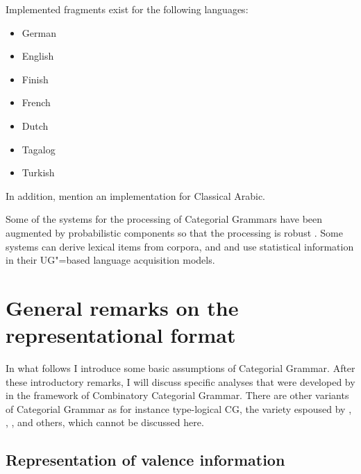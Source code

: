 Implemented fragments exist for the following languages:
\begin{itemize}
\item German \citep*{Uszkoreit86d,Koenig99a-u,VHE2003a,VTBS2011a}
\item English \citep{Villavicencio2002a,Baldridge2002a-u,Beavers2002a-u,Beavers2004a-u}
\item Finish \citep{Karttunen89a-u}
\item French \citep*{BBCG87a-u}
\item Dutch \citep{BvN94a-u,Baldridge2002a-u}
\item Tagalog \citep{Baldridge2002a-u}
\item Turkish \citep{Hoffmann95a-u,Baldridge2002a-u}
\end{itemize}
In addition, \citet*[]{BCPW2007a} mention an implementation for Classical Arabic.

Some of the systems for the processing of Categorial Grammars have been augmented by probabilistic
components so that the processing is robust \citep*{OB97a,CHS2002a-u}. Some systems can derive lexical items from corpora, and \citet{Briscoe2000a} and \citet{Villavicencio2002a} use statistical
information in their UG"=based language acquisition models.




\section{General remarks on the representational format}

In what follows I introduce some basic assumptions of Categorial Grammar. After these
introductory remarks, I will discuss specific analyses that were developed by \citet{Steedman97a}
in the framework of Combinatory Categorial Grammar. There are other variants of Categorial Grammar as for instance type-logical CG,
the variety espoused by \citet{Morrill94a-u}, \citet{Dowty97a-u}, \citet{Moortgat2011a-u}, and others, which cannot be discussed here.

\subsection{Representation of valence information}
\label{sec-forward-backward-application}

